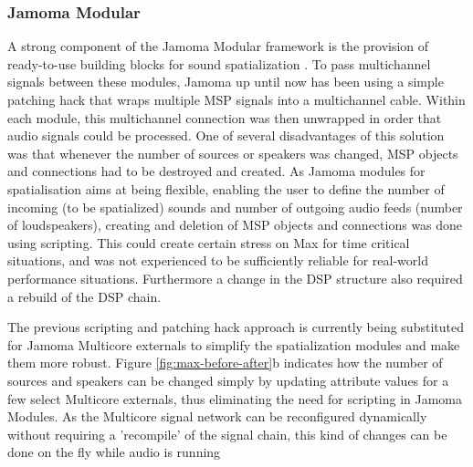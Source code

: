 \documentclass[twoside,a4paper]{article}
\begin{document}
\subsubsection{Jamoma Modular} %
A strong component of the Jamoma Modular framework is the provision of ready-to-use building blocks for sound spatialization \cite{Peters:2009}.
To pass multichannel signals between these modules, Jamoma up until now has been using a simple patching hack that wraps multiple MSP signals into a multichannel cable. Within each module, this multichannel connection was then unwrapped in order that audio signals could be processed. 
One of several disadvantages of this solution was that whenever the number of sources or speakers was changed, MSP objects and connections had to be destroyed and created.
As Jamoma modules for spatialisation aims at being flexible, enabling the user to define the number of incoming (to be spatialized) sounds and number of outgoing audio feeds (number of loudspeakers), creating and deletion of MSP objects and connections was done using scripting.
This could create certain stress on Max for time critical situations, and was not experienced to be sufficiently reliable for real-world performance situations.
Furthermore a change in the DSP structure also required a rebuild of the DSP chain.

The previous scripting and patching hack approach is currently being substituted for Jamoma Multicore externals to simplify the spatialization modules and make them more robust.
Figure \ref{fig:max-before-after}b indicates how the number of sources and speakers can be changed simply by updating attribute values for a few select Multicore externals, thus eliminating the need for scripting in Jamoma Modules.
As the Multicore signal network can be reconfigured dynamically without requiring a 'recompile' of the signal chain, this kind of changes can be done on the fly while audio is running


\end{document}
